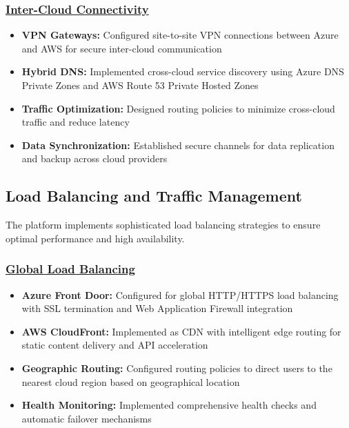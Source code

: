 \subsubsection*{\underline{Inter-Cloud Connectivity}}
\begin{itemize}
    \item \textbf{VPN Gateways:} Configured site-to-site VPN connections between Azure and AWS for secure inter-cloud communication
    \item \textbf{Hybrid DNS:} Implemented cross-cloud service discovery using Azure DNS Private Zones and AWS Route 53 Private Hosted Zones
    \item \textbf{Traffic Optimization:} Designed routing policies to minimize cross-cloud traffic and reduce latency
    \item \textbf{Data Synchronization:} Established secure channels for data replication and backup across cloud providers
\end{itemize}

\subsection{Load Balancing and Traffic Management}
The platform implements sophisticated load balancing strategies to ensure optimal performance and high availability.

\subsubsection*{\underline{Global Load Balancing}}
\begin{itemize}
    \item \textbf{Azure Front Door:} Configured for global HTTP/HTTPS load balancing with SSL termination and Web Application Firewall integration
    \item \textbf{AWS CloudFront:} Implemented as CDN with intelligent edge routing for static content delivery and API acceleration
    \item \textbf{Geographic Routing:} Configured routing policies to direct users to the nearest cloud region based on geographical location
    \item \textbf{Health Monitoring:} Implemented comprehensive health checks and automatic failover mechanisms
\end{itemize}

